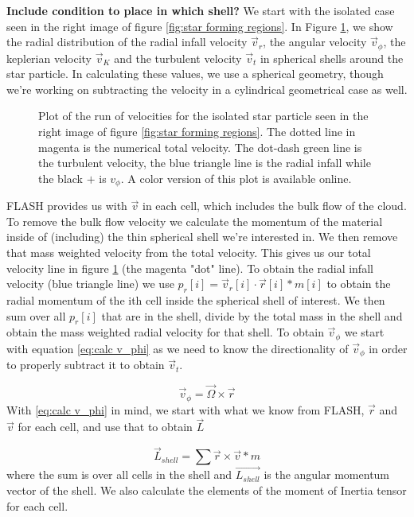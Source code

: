 \documentclass{emulateapj}
\newcommand{\be}{\begin{equation}}
\newcommand{\ee}{\end{equation}}
\begin{document}
{\bf Include condition to place in which shell?}
We start with the isolated case seen in the right image of figure \ref{fig:star forming regions}. In Figure \ref{fig:quad3_320_velocity_example}, we show the radial distribution of the radial infall velocity $\vec{v}_r$, the angular velocity $\vec{v}_{\phi}$, the keplerian velocity $\vec{v}_{K}$ and the turbulent velocity $\vec{v}_{t}$ in spherical shells around the star particle. In calculating these values, we use a spherical geometry, though we're working on subtracting the velocity in a  cylindrical geometrical case as well. 

\begin{figure}
\caption{Plot of the run of velocities for the isolated star particle seen in the right image of figure \ref{fig:star forming regions}. The dotted line in magenta is the numerical total velocity. The dot-dash green line is the turbulent velocity, the blue triangle line is the radial infall while the black $+$ is $v_{\phi}$. A color version of this plot is available online.
\label{fig:quad3_320_velocity_example}}
\end{figure}

FLASH provides us with $\vec{v}$ in each cell, which includes the bulk flow of the cloud. To remove the bulk flow velocity we calculate the momentum of the material inside of (including) the thin spherical shell we're interested in. We then remove that mass weighted velocity from the total velocity. This gives us our total velocity line in figure \ref{fig:quad3_320_velocity_example} (the magenta "dot" line). 
To obtain the radial infall velocity (blue triangle line) we use $p_r[i] = \vec{v}_r[i] \cdot \vec{r}[i] * m[i]$ to obtain the radial momentum of the ith cell inside the spherical shell of interest. We then sum over all $p_{r}[i]$ that are in the shell, divide by the total mass in the shell and obtain the mass weighted radial velocity for that shell. 
To obtain $\vec{v}_{\phi}$ we start with equation \ref{eq:calc v_phi} as we need to know the directionality of $\vec{v}_{\phi}$ in order to properly subtract it to obtain $\vec{v}_{t}$.

\be
\vec{v}_{\phi} = \vec{\Omega} \times \vec{r}
\label{eq:calc v_phi}
\ee
With \ref{eq:calc v_phi} in mind, we start with what we know from FLASH, $\vec{r}$ and $\vec{v}$ for each cell, and use that to obtain $\vec{L}$

\be
\vec{L}_{shell} = \sum{\vec{r} \times \vec{v} * m}
\label{eq:calc L shell}
\ee
where the sum is over all cells in the shell and $\vec{L_{shell}}$ is the angular momentum vector of the shell. We also calculate the elements of the moment of Inertia tensor for each cell.
\end{document}
